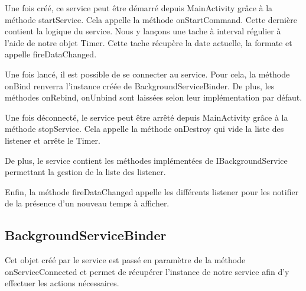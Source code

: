 \documentclass{report}
\begin{document}
			Une fois créé, ce service peut être démarré depuis MainActivity grâce à la méthode startService.
			Cela appelle la méthode onStartCommand.
			Cette dernière contient la logique du service.
			Nous y lançons une tache à interval régulier à l'aide de notre objet Timer.
			Cette tache récupère la date actuelle, la formate et appelle fireDataChanged.

			Une fois lancé, il est possible de se connecter au service.
			Pour cela, la méthode onBind renverra l'instance créée de BackgroundServiceBinder.
			De plus, les méthodes onRebind, onUnbind sont laissées selon leur implémentation par défaut.

			Une fois déconnecté, le service peut être arrêté depuis MainActivity grâce à la méthode stopService.
			Cela appelle la méthode onDestroy qui vide la liste des listener et arrête le Timer. 

			De plus, le service contient les méthodes implémentées de IBackgroundService permettant la gestion de la liste des listener.

			Enfin, la méthode fireDataChanged appelle les différents listener pour les notifier de la présence d'un nouveau temps à afficher.
		
		\subsection{BackgroundServiceBinder}
			Cet objet créé par le service est passé en paramètre de la méthode onServiceConnected et permet de récupérer l'instance de notre service afin d'y effectuer les actions nécessaires.
				
\end{document}
